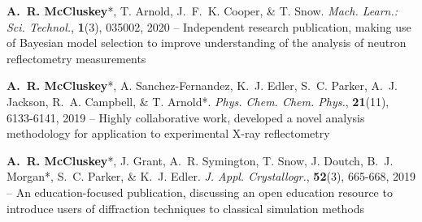 \begin{cventriesy}
  \cventryy
    {
      \begin{cvitemsy}
        \item {\textbf{A.~R. McCluskey}*, T. Arnold, J.~F.~K. Cooper, \& T. Snow. \emph{Mach. Learn.: Sci. Technol.}, \textbf{1}(3), 035002, 2020 -- Independent research publication, making use of Bayesian model selection to improve understanding of the analysis of neutron reflectometry measurements}
    \vspace{1mm}
        \item {\textbf{A.~R. McCluskey}*, A. Sanchez-Fernandez, K.~J. Edler, S.~C. Parker, A.~J. Jackson, R.~A. Campbell, \& T. Arnold*. \emph{Phys. Chem. Chem. Phys.}, \textbf{21}(11), 6133-6141, 2019 -- Highly collaborative work, developed a novel analysis methodology for application to experimental X-ray reflectometry}
    \vspace{1mm}
        \item {\textbf{A.~R. McCluskey}*, J. Grant, A.~R. Symington, T. Snow, J. Doutch, B.~J. Morgan*, S.~C. Parker, \& K.~J. Edler. \emph{J. Appl. Crystallogr.}, \textbf{52}(3), 665-668, 2019 -- An education-focused publication, discussing an open education resource to introduce users of diffraction techniques to classical simulation methods} 
      \end{cvitemsy}
    }
\end{cventriesy}
